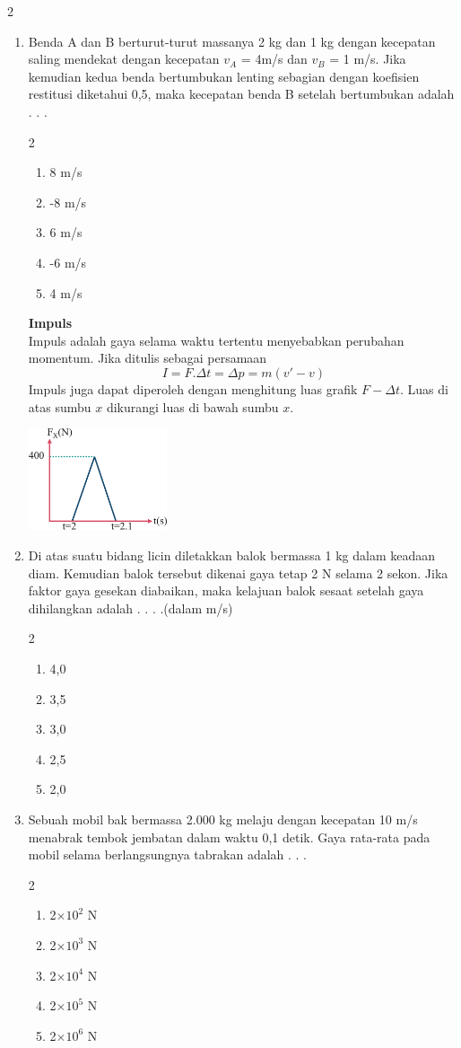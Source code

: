 \documentclass[10pt,a4paper]{extarticle}
\newcommand{\pilgani}[1]{                            \vspace{-0.3cm}\begin{multicols}{2}
 \begin{enumerate}[label=\Alph*., itemsep=0pt,topsep=0pt,leftmargin=*,align=Center]#1                     \end{enumerate}
 \phantom{ini cuma sapi, wedus, dan ayam}
 \end{multicols}}
\begin{document}
\begin{multicols*}{2}
\begin{enumerate}
\vspace{4cm}

\item Benda A dan B berturut-turut massanya 2 kg dan 1 kg dengan kecepatan saling mendekat dengan kecepatan $v_A$ = 4m/s dan $v_B$ = 1 m/s. Jika kemudian kedua benda bertumbukan lenting sebagian dengan koefisien restitusi diketahui 0,5, maka kecepatan benda B setelah bertumbukan adalah . . .
\pilgani{
        \item 8 m/s
        \item -8 m/s
        \item 6 m/s
        \item -6 m/s
        \item 4 m/s
        }
\vspace{4cm}




\textbf{ Impuls }\\
Impuls adalah gaya selama waktu tertentu menyebabkan perubahan momentum. Jika ditulis sebagai persamaan
$$ I = F.\Delta t = \Delta p = m(v'-v)$$
Impuls juga dapat diperoleh dengan menghitung luas grafik $F-\Delta t$. Luas di atas sumbu $x$ dikurangi luas di bawah sumbu $x$.
\begin{center}
\includegraphics[height=3cm]{pic/impuls}
\end{center}
\item Di atas suatu bidang licin diletakkan balok bermassa 1 kg dalam keadaan diam. Kemudian balok tersebut dikenai gaya tetap 2 N selama 2 sekon. Jika faktor gaya gesekan diabaikan, maka kelajuan balok sesaat setelah gaya dihilangkan adalah . . . .(dalam m/s)
\pilgani{
        \item 4,0
        \item 3,5
        \item 3,0
        \item 2,5
        \item 2,0}

\vspace{2cm}


\item Sebuah mobil bak bermassa 2.000 kg melaju dengan kecepatan 10 m/s menabrak tembok jembatan dalam waktu 0,1 detik. Gaya rata-rata pada mobil selama berlangsungnya tabrakan adalah . . .
\pilgani{
        \item 2$\times 10^2$ N
        \item 2$\times 10^3$ N
        \item 2$\times 10^4$ N
        \item 2$\times 10^5$ N
        \item 2$\times 10^6$ N
        }


\end{enumerate}
\end{multicols*}
\end{document}
